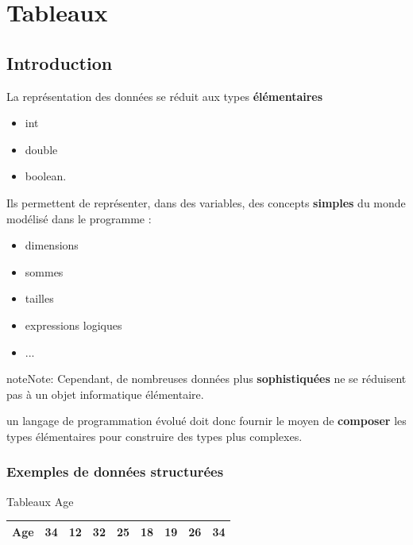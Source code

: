 \documentclass[letterpaper,10pt,english]{sphinxmanual}
\begin{document}
\section{Tableaux}
\label{tableaux1::doc}\label{tableaux1:tableaux}

\subsection{Introduction}
\label{tableaux1:introduction}
La représentation des données se réduit aux types \textbf{élémentaires}
\begin{itemize}
\item {} 
int

\item {} 
double

\item {} 
boolean.

\end{itemize}

Ils permettent de représenter, dans des variables, des concepts \textbf{simples} du monde modélisé dans le programme :
\begin{itemize}
\item {} 
dimensions

\item {} 
sommes

\item {} 
tailles

\item {} 
expressions logiques

\item {} 
...

\end{itemize}

\begin{notice}{note}{Note:}
Cependant, de nombreuses données plus \textbf{sophistiquées} ne se réduisent pas à un objet informatique élémentaire.
\end{notice}

un langage de programmation évolué doit donc fournir le moyen de \textbf{composer} les types élémentaires pour construire des types plus complexes.


\subsubsection{Exemples de données structurées}
\label{tableaux1:exemples-de-donnees-structurees}

\begin{threeparttable}
\capstart\caption{Tableaux Age}

\begin{tabulary}{\linewidth}{|L|L|L|L|L|L|L|L|L|}
\hline

Age
 & 
34
 & 
12
 & 
32
 & 
25
 & 
18
 & 
19
 & 
26
 & 
34
\\
\hline\end{tabulary}

\end{threeparttable}
\end{document}
